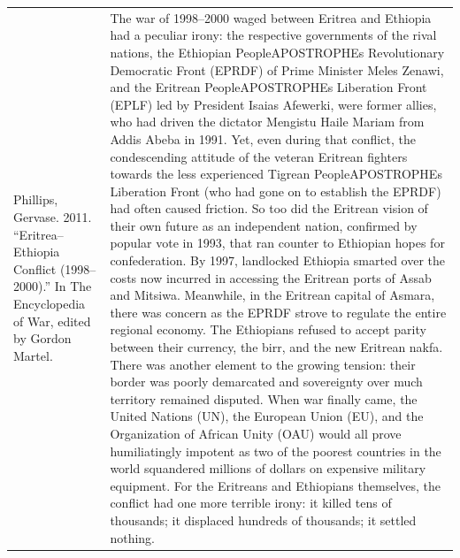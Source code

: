 {\begin{longtable}{p{}p{}}
Phillips, Gervase. 2011. “Eritrea–Ethiopia Conflict (1998–2000).” In The Encyclopedia of War, edited by Gordon Martel. & The war of 1998–2000 waged between Eritrea and Ethiopia had a peculiar irony: the respective governments of the rival nations, the Ethiopian PeopleAPOSTROPHEs Revolutionary Democratic Front (EPRDF) of Prime Minister Meles Zenawi, and the Eritrean PeopleAPOSTROPHEs Liberation Front (EPLF) led by President Isaias Afewerki, were former allies, who had driven the dictator Mengistu Haile Mariam from Addis Abeba in 1991. Yet, even during that conflict, the condescending attitude of the veteran Eritrean fighters towards the less experienced Tigrean PeopleAPOSTROPHEs Liberation Front (who had gone on to establish the EPRDF) had often caused friction. So too did the Eritrean vision of their own future as an independent nation, confirmed by popular vote in 1993, that ran counter to Ethiopian hopes for confederation. By 1997, landlocked Ethiopia smarted over the costs now incurred in accessing the Eritrean ports of Assab and Mitsiwa. Meanwhile, in the Eritrean capital of Asmara, there was concern as the EPRDF strove to regulate the entire regional economy. The Ethiopians refused to accept parity between their currency, the birr, and the new Eritrean nakfa. There was another element to the growing tension: their border was poorly demarcated and sovereignty over much territory remained disputed. When war finally came, the United Nations (UN), the European Union (EU), and the Organization of African Unity (OAU) would all prove humiliatingly impotent as two of the poorest countries in the world squandered millions of dollars on expensive military equipment. For the Eritreans and Ethiopians themselves, the conflict had one more terrible irony: it killed tens of thousands; it displaced hundreds of thousands; it settled nothing.



\end{longtable}}
